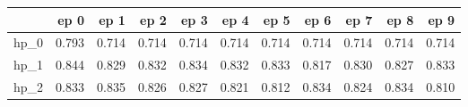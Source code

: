\begin{tabular}{lrrrrrrrrrr}
\toprule
{} &   ep 0 &   ep 1 &   ep 2 &   ep 3 &   ep 4 &   ep 5 &   ep 6 &   ep 7 &   ep 8 &   ep 9 \\
\midrule
hp\_0 &  0.793 &  0.714 &  0.714 &  0.714 &  0.714 &  0.714 &  0.714 &  0.714 &  0.714 &  0.714 \\
hp\_1 &  0.844 &  0.829 &  0.832 &  0.834 &  0.832 &  0.833 &  0.817 &  0.830 &  0.827 &  0.833 \\
hp\_2 &  0.833 &  0.835 &  0.826 &  0.827 &  0.821 &  0.812 &  0.834 &  0.824 &  0.834 &  0.810 \\
\bottomrule
\end{tabular}
